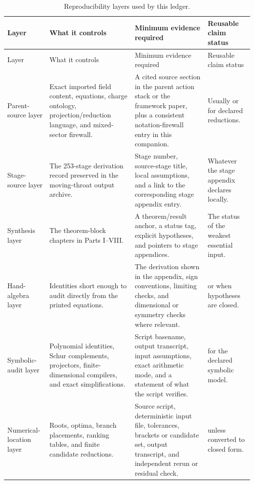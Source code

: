 \begin{longtable}{@{}L{0.17\textwidth}L{0.23\textwidth}L{0.36\textwidth}L{0.16\textwidth}@{}}
\caption{Reproducibility layers used by this ledger.}\label{tab:reproducibility-layers}\\
\toprule
Layer & What it controls & Minimum evidence required & Reusable claim status \\
\midrule
\endfirsthead
\toprule
Layer & What it controls & Minimum evidence required & Reusable claim status \\
\midrule
\endhead
Parent-source layer & Exact imported field content, equations, charge ontology, projection/reduction language, and mixed-sector firewall. & A cited source section in the parent action stack or the framework paper, plus a consistent notation-firewall entry in this companion. & Usually \StatusExact{} or \StatusReduced{} for declared reductions. \\
\addlinespace
Stage-source layer & The 253-stage derivation record preserved in the moving-throat output archive. & Stage number, source-stage title, local assumptions, and a link to the corresponding stage appendix entry. & Whatever the stage appendix declares locally. \\
\addlinespace
Synthesis layer & The theorem-block chapters in Parts I--VIII. & A theorem/result anchor, a status tag, explicit hypotheses, and pointers to stage appendices. & The status of the weakest essential input. \\
\addlinespace
Hand-algebra layer & Identities short enough to audit directly from the printed equations. & The derivation shown in the appendix, sign conventions, limiting checks, and dimensional or symmetry checks where relevant. & \StatusExact{} or \StatusExactClosure{} when hypotheses are closed. \\
\addlinespace
Symbolic-audit layer & Polynomial identities, Schur complements, projectors, finite-dimensional compilers, and exact simplifications. & Script basename, output transcript, input assumptions, exact arithmetic mode, and a statement of what the script verifies. & \StatusExactClosure{} for the declared symbolic model. \\
\addlinespace
Numerical-location layer & Roots, optima, branch placements, ranking tables, and finite candidate reductions. & Source script, deterministic input file, tolerances, brackets or candidate set, output transcript, and independent rerun or residual check. & \StatusNumerical{} unless converted to closed form. \\

\end{longtable}
